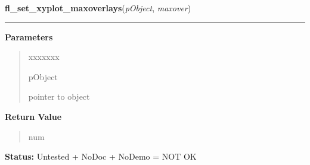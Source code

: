 \hspace{.8\funcindent}\begin{boxedminipage}{\funcwidth}

    \raggedright \textbf{fl\_set\_xyplot\_maxoverlays}(\textit{pObject}, \textit{maxover})

    \vspace{-1.5ex}

    \rule{\textwidth}{0.5\fboxrule}
\setlength{\parskip}{2ex}
\setlength{\parskip}{1ex}
      \textbf{Parameters}
      \vspace{-1ex}

      \begin{quote}
        \begin{Ventry}{xxxxxxx}

          \item[pObject]

          pointer to object

        \end{Ventry}

      \end{quote}

      \textbf{Return Value}
    \vspace{-1ex}

      \begin{quote}
      num

      \end{quote}

\textbf{Status:} Untested + NoDoc + NoDemo = NOT OK



    \end{boxedminipage}

    \label{xformslib:library:fl_add_xyplot_overlay}

    \vspace{0.5ex}

